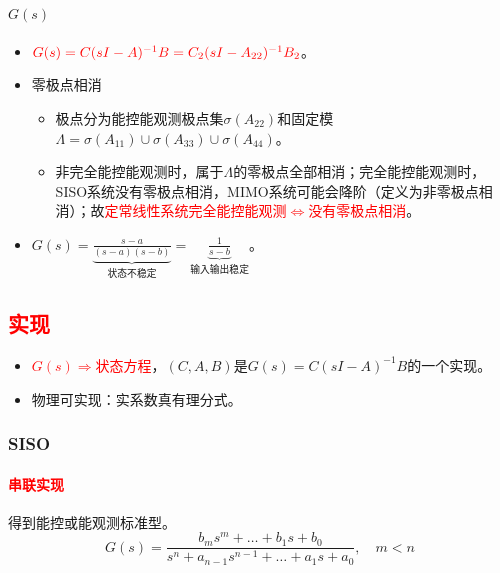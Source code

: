\documentclass[
12pt, %
a4paper, 
oneside, %
]{scrartcl}
\begin{document}
\paragraph{$ G(s) $}
\begin{itemize}
\item $ \textcolor{red}{G(s) = C (sI - A)^{-1} B = C_2 (sI - A_{22})^{-1} B_2} $。
\item 零极点相消
\begin{itemize}
\item 极点分为能控能观测极点集$ \sigma(A_{22}) $和固定模$ \Lambda = \sigma(A_{11}) \cup \sigma(A_{33}) \cup \sigma(A_{44}) $。
\item 非完全能控能观测时，属于$ \Lambda $的零极点全部相消；完全能控能观测时，SISO系统没有零极点相消，MIMO系统可能会降阶（定义为非零极点相消）；故\textcolor{red}{定常线性系统完全能控能观测$ \Leftrightarrow $没有零极点相消}。
\end{itemize}
\item $ G(s) = \underbrace{\frac{s - a}{(s - a)(s - b)}}_{\text{状态不稳定}} = \underbrace{\frac{1}{s - b}}_{\text{输入输出稳定}} $。
\end{itemize}
\subsection[实现]{\textcolor{red}{实现}}
\begin{itemize}
\item \textcolor{red}{$ G(s) \Rightarrow $状态方程}，$ (C, A, B) $是$ G(s) = C (sI - A)^{-1} B $的一个实现。
\item 物理可实现：实系数真有理分式。
\end{itemize}
\subsubsection[SISO]{SISO}
\paragraph{\textcolor{red}{串联实现}}
得到能控或能观测标准型。
$$ G(s) = \frac{b_m s^m + \dots + b_1 s + b_0}{s^n + a_{n - 1} s^{n - 1} + \dots + a_1 s + a_0}, \quad m < n $$
\end{document}
